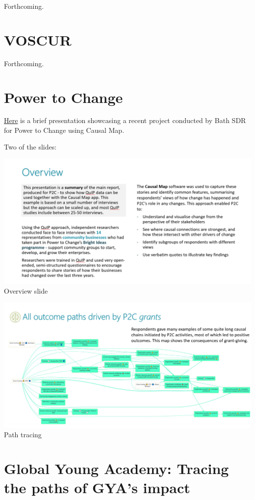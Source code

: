 \documentclass[
]{book}
\begin{document}
Forthcoming.

\hypertarget{voscur}{%
\section{VOSCUR}\label{voscur}}

Forthcoming.

\hypertarget{power-to-change}{%
\section{Power to Change}\label{power-to-change}}

\href{https://drive.google.com/file/d/18OIi1FzLR3YX9FWiSEkqKnNDJyKQXX78/view}{Here} is a brief presentation showcasing a recent project conducted by Bath SDR for Power to Change using Causal Map.

Two of the slides:

\includegraphics{_assets/de1f66536036d0c064f913bf0cabe84e.png}
Overview slide

\includegraphics{_assets/ffd477406e03440d64bb63d5ca315b93.png}
Path tracing

\hypertarget{global-young-academy-tracing-the-paths-of-gyas-impact}{%
\section{Global Young Academy: Tracing the paths of GYA's impact}\label{global-young-academy-tracing-the-paths-of-gyas-impact}}
\end{document}
